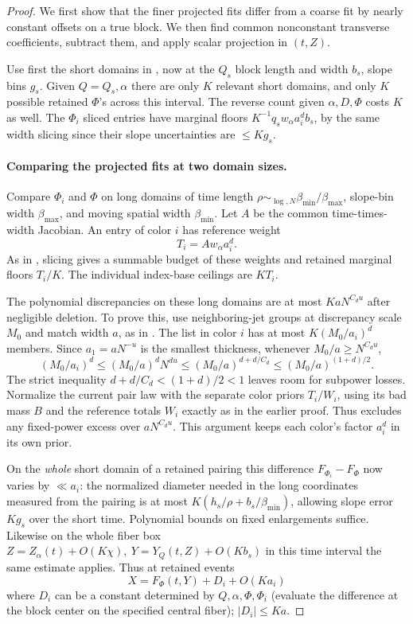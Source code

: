 \begin{proof}
We first show that the finer projected fits differ from a coarse fit
by nearly constant offsets on a true block.  We then find common
nonconstant transverse coefficients, subtract them, and apply scalar
projection in \((t,Z)\).

Use first the short domains in , now at the \(Q_s\) block length and width \(b_s\), slope bins \(g_s\). Given \(Q=Q_s,\alpha\) there are only \(K\) relevant short domains, and only \(K\) possible retained \(\Phi\)'s across this interval. The reverse count given \(\alpha,D,\Phi\) costs \(K\) as well. The \(\Phi_i\) sliced entries have marginal floors \(K^{-1} q_s w_\alpha a_i^d b_s\), by the same width slicing since their slope uncertainties are \(\le K g_s\).

\paragraph{Comparing the projected fits at two domain sizes.}
Compare \(\Phi_i\) and \(\Phi\) on long domains of time length
\(\rho\sim_{\log,N}\beta_{\min}/\beta_{\max}\), slope-bin
width \(\beta_{\max}\), and moving spatial width \(\beta_{\min}\).
Let \(A\) be the common time-times-width Jacobian.  An entry of
color \(i\) has reference weight
\[
 T_i=A w_\alpha a_i^d.
\]
As in , slicing gives a summable
budget of these weights and retained marginal floors \(T_i/K\).
The individual index-base ceilings are \(KT_i\).

The polynomial discrepancies on these long domains are at most
\(KaN^{C_du}\) after negligible deletion.  To prove this, use
neighboring-jet groups at discrepancy scale \(M_0\) and match
width \(a\), as in .  The list
in color \(i\) has at most \(K(M_0/a_i)^d\) members.  Since
\(a_1=aN^{-u}\) is the smallest thickness, whenever
\(M_0/a\ge N^{C_du}\),
\[
 (M_0/a_i)^d\le(M_0/a)^dN^{du}
 \le(M_0/a)^{d+d/C_d}
 \le(M_0/a)^{(1+d)/2}.
\]
The strict inequality \(d+d/C_d<(1+d)/2<1\) leaves room for
subpower losses.  Normalize the current pair law with the separate
color priors \(T_i/W_i\), using its bad mass \(B\) and the
reference totals \(W_i\) exactly as in the earlier proof.
Thus  excludes any fixed-power
excess over \(aN^{C_du}\).  This argument keeps each color's
factor \(a_i^d\) in its own prior.

On the \emph{whole} short domain of a retained pairing this
difference \(F_{\Phi_i}-F_\Phi\) now varies by \(\ll a_i\):
the normalized diameter needed in the long coordinates measured
from the pairing is at most
\(K(h_s/\rho + b_s/\beta_{\min})\), allowing slope error
\(K g_s\) over the short time. Polynomial bounds on fixed
enlargements suffice. Likewise on the whole fiber box
\(Z=Z_\alpha(t)+O(K\chi),\ Y=Y_Q(t,Z)+O(K b_s)\) in this
time interval the same estimate applies. Thus at retained events
\[
 X=F_\Phi(t,Y)+D_i+O(K a_i)
\]
where \(D_i\) can be a constant determined by
\(Q,\alpha,\Phi,\Phi_i\) (evaluate the difference at the block
center on the specified central fiber); \(|D_i|\le K a\).


\end{proof}

